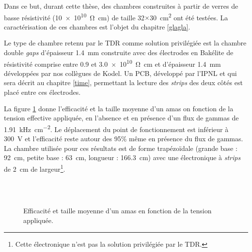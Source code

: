 Dans ce but, durant cette thèse, des chambres construites à partir de verres de basse résistivité (\SI{10e10}{\ohm\centi\meter}) de taille \num{32}$\times$\SI{30}{\square\centi\meter} ont été testées. La caractérisation de ces chambres est l'objet du chapitre \ref{glagla}.


Le type de chambre retenu par le TDR comme solution privilégiée est la chambre double \textit{gaps} d'épaisseur \SI{1.4}{\milli\meter} construite avec des électrodes en Bakélite de résistivité comprise entre \num{0.9} et \SI{3.0e10}{\ohm\centi\meter} et d'épaisseur \SI{1.4}{\milli\meter} développées par nos collègues de Kodel. Un PCB, développé par l'IPNL et qui sera décrit au chapitre \ref{time}, permettant la lecture des \textit{strips} des deux côtés est placé entre ces électrodes. 

La figure \ref{datairpc} donne l'efficacité et la taille moyenne d'un amas on fonction de la tension effective appliquée, en l'absence et en présence d'un flux de gammas de \SI{1.91}{\kilo\hertz\per\square\centi\meter}. Le déplacement du point de fonctionnement est inférieur à \SI{300}{\volt} et l'efficacité reste autour des \num{95}\% même en présence du flux de gammas. La chambre utilisée pour ces résultats est de forme trapézoïdale (grande base : \SI{92}{\centi\meter}, petite base : \SI{63}{\centi\meter}, longueur : \SI{166.3}{\centi\meter}) avec une électronique à \textit{strips} de \SI{2}{\centi\meter} de largeur\footnote{Cette électronique n'est pas la solution privilégiée par le TDR.}.

\begin{figure}[ht!]
	\centering
	\\
	\\
	\caption{Efficacité et taille moyenne d'un amas en fonction de la tension appliquée.}
	\label{datairpc}
\end{figure}

